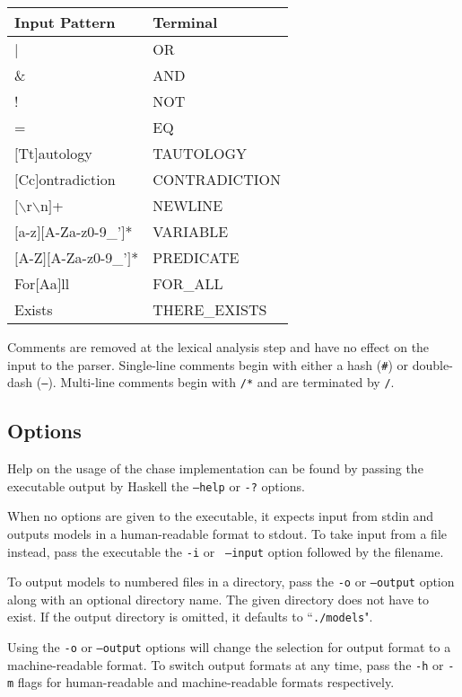 		{\tt \begin{tabular}{|l|l|}
			\hline
			\textbf{Input Pattern} & \textbf{Terminal} \\
			\hline
			|                    & OR  \\
			\&                   & AND \\
			!                    & NOT \\
			=                    & EQ  \\
			$[$Tt$]$autology     & TAUTOLOGY \\
			$[$Cc$]$ontradiction & CONTRADICTION \\
			$[\backslash$r$\backslash$n$]$+ & NEWLINE \\
			$[$a-z$][$A-Za-z0-9\_'$]$* & VARIABLE \\
			$[$A-Z$][$A-Za-z0-9\_'$]$* & PREDICATE \\
			For$[$Aa$]$ll        & FOR\_ALL \\
			Exists               & THERE\_EXISTS \\
			\hline
		\end{tabular} }

		Comments are removed at the lexical analysis step and have no effect on
		the input to the parser. Single-line comments begin with either a hash
		({\tt \#}) or double-dash ({\tt --}). Multi-line comments begin with
		{\tt /*} and are terminated by {\tt */}.

	\subsection{Options}

		Help on the usage of the chase implementation can be found by passing
		the executable output by Haskell the {\tt --help} or {\tt -?} options.

		When no options are given to the executable, it expects input from
		stdin and outputs models in a human-readable format to stdout. To take
		input from a file instead, pass the executable the {\tt -i} or {\tt
		--input} option followed by the filename.

		To output models to numbered files in a directory, pass the {\tt -o} or
		{\tt --output} option along with an optional directory name. The given
		directory does not have to exist. If the output directory is omitted,
		it defaults to ``{\tt ./models}".

		Using the {\tt -o} or {\tt --output} options will change the selection
		for output format to a machine-readable format. To switch output formats
		at any time, pass the {\tt -h} or {\tt -m} flags for human-readable and
		machine-readable formats respectively.


